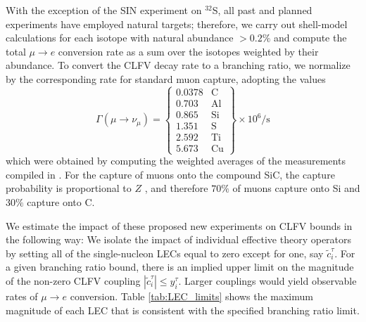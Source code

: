 \documentclass[12pt,letterpaper]{book}
\begin{document}
With the exception of the SIN experiment on $^{32}$S, all past and planned experiments have employed natural targets; therefore, we carry out shell-model calculations for each isotope with natural abundance $>0.2\%$ and compute the total $\mu\rightarrow e$ conversion rate as a sum over the isotopes weighted by their abundance. To convert the CLFV decay rate to a branching ratio, we normalize by the corresponding rate for standard muon capture, adopting the values
\begin{equation}
\Gamma\left(\mu\rightarrow\nu_{\mu}\right)=\left\{\begin{array}{lr}
0.0378 & \mathrm{C}\\
0.703 & \mathrm{Al}\\
0.865 & \mathrm{Si}\\
1.351 & \mathrm{S}\\
2.592 & \mathrm{Ti}\\
5.673 & \mathrm{Cu}
\end{array}\right\}\times 10^6\mathrm{/s}
\end{equation}
which were obtained by computing the weighted averages of the measurements compiled in \cite{PhysRevC.35.2212}. For the capture of muons onto the compound SiC, the capture probability is proportional to $Z$ \cite{PhysRev.72.399}, and therefore $70\%$ of muons capture onto Si and $30\%$ capture onto C.

We estimate the impact of these proposed new experiments on CLFV bounds in the following way: We isolate the impact of individual effective theory operators by setting all of the single-nucleon LECs equal to zero except for one, say $\tilde{c}_i^{\tau}$. For a given branching ratio bound, there is an implied upper limit on the magnitude of the non-zero CLFV coupling $|\tilde{c}_i^{\tau}|\leq y_i^{\tau}$. Larger couplings would yield observable rates of $\mu\rightarrow e$ conversion. Table \ref{tab:LEC_limits} shows the maximum magnitude of each LEC that is consistent with the specified branching ratio limit. 
\end{document}
